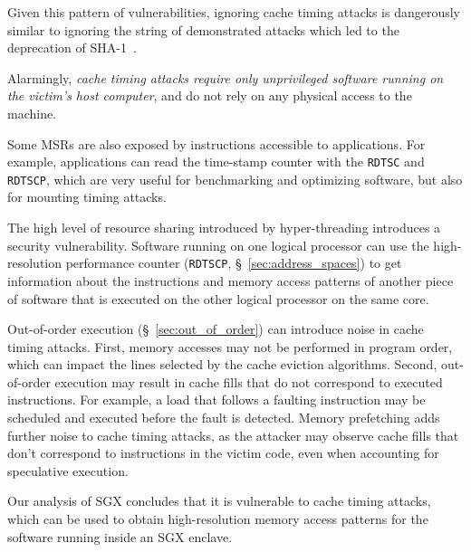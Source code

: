 Given this pattern of vulnerabilities, ignoring cache timing attacks is
dangerously similar to ignoring the string of demonstrated attacks which led to
the deprecation of SHA-1~\cite{nist2014sha1policy, google2014sha1deprecation,
microsoft2014sha1deprecation}.

Alarmingly, {\em cache timing attacks require only unprivileged software
running on the victim's host computer}, and do not rely on any physical
access to the machine.

Some MSRs are also
exposed by instructions accessible to applications. For example, applications
can read the time-stamp counter with the \texttt{RDTSC} and \texttt{RDTSCP},
which are very useful for benchmarking and optimizing software, but also for
mounting timing attacks.

The high level of resource sharing introduced by hyper-threading introduces a
security vulnerability. Software running on one logical processor can use the
high-resolution performance counter (\texttt{RDTSCP},
\S~\ref{sec:address_spaces}) \cite{petters1999making} to get information about
the instructions and memory access patterns of another piece of software that
is executed on the other logical processor on the same core.

Out-of-order execution (\S~\ref{sec:out_of_order}) can introduce noise in cache
timing attacks. First, memory accesses may not be performed in program order,
which can impact the lines selected by the cache eviction algorithms. Second,
out-of-order execution may result in cache fills that do not correspond to
executed instructions. For example, a load that follows a faulting instruction
may be scheduled and executed before the fault is detected. Memory prefetching
adds further noise to cache timing attacks, as the attacker may observe cache
fills that don't correspond to instructions in the victim code, even when
accounting for speculative execution.

Our analysis of SGX concludes that it is vulnerable to cache timing attacks,
which can be used to obtain high-resolution memory access patterns for the
software running inside an SGX enclave.
